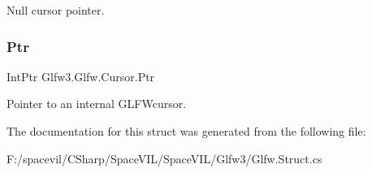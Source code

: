 Null cursor pointer.\mbox{\label{struct_glfw3_1_1_glfw_1_1_cursor_a7ac68cfb8aaf790598460dac88d81e11}} 
\subsubsection{\texorpdfstring{Ptr}{Ptr}}
{\footnotesize\ttfamily Int\+Ptr Glfw3.\+Glfw.\+Cursor.\+Ptr}



Pointer to an internal G\+L\+F\+Wcursor. 



The documentation for this struct was generated from the following file\+:\begin{DoxyCompactItemize}
\item 
F\+:/spacevil/\+C\+Sharp/\+Space\+V\+I\+L/\+Space\+V\+I\+L/\+Glfw3/Glfw.\+Struct.\+cs\end{DoxyCompactItemize}
